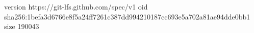 version https://git-lfs.github.com/spec/v1
oid sha256:1befa3d6766e8f5a24ff7261c387dd994210187cc693e5a702a81ae94dde0bb1
size 190043
